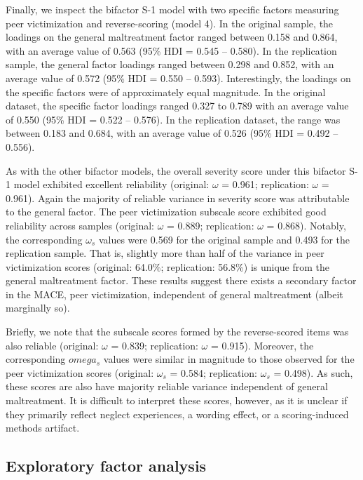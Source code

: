 \documentclass[letterpaper,man,natbib,floatsintext,longtable]{apa6}
\begin{document}
Finally, we inspect the bifactor S-1 model with two specific factors measuring peer victimization and reverse-scoring (model 4). In the original sample, the loadings on the general maltreatment factor ranged between 0.158 and 0.864, with an average value of 0.563 (95\% HDI = 0.545 -- 0.580). In the replication sample, the general factor loadings ranged between 0.298 and 0.852, with an average value of 0.572 (95\% HDI = 0.550 -- 0.593). Interestingly, the loadings on the specific factors were of approximately equal magnitude. In the original dataset, the specific factor loadings ranged 0.327 to 0.789 with an average value of 0.550 (95\% HDI = 0.522 -- 0.576). In the replication dataset, the range was between 0.183 and 0.684, with an average value of 0.526 (95\% HDI = 0.492 -- 0.556). 

As with the other bifactor models, the overall severity score under this bifactor S-1 model exhibited excellent reliability (original: $\omega$ = 0.961; replication: $\omega$ = 0.961). Again the majority of reliable variance in severity score was attributable to the general factor. The peer victimization subscale score exhibited good reliability across samples (original: $\omega$ = 0.889; replication: $\omega$ = 0.868). Notably, the corresponding $\omega_s$ values were 0.569 for the original sample and 0.493 for the replication sample. That is, slightly more than half of the variance in peer victimization scores (original: 64.0\%; replication: 56.8\%) is unique from the general maltreatment factor. These results suggest there exists a secondary factor in the MACE, peer victimization, independent of general maltreatment (albeit marginally so). 

Briefly, we note that the subscale scores formed by the reverse-scored items was also reliable (original: $\omega$ = 0.839; replication: $\omega$ = 0.915). Moreover, the corresponding $omega_s$ values were similar in magnitude to those observed for the peer victimization scores (original: $\omega_s$ = 0.584; replication: $\omega_s$ = 0.498). As such, these scores are also have majority reliable variance independent of general maltreatment. It is difficult to interpret these scores, however, as it is unclear if they primarily reflect neglect experiences, a wording effect, or a scoring-induced methods artifact. 

\subsection{Exploratory factor analysis}
\end{document}
